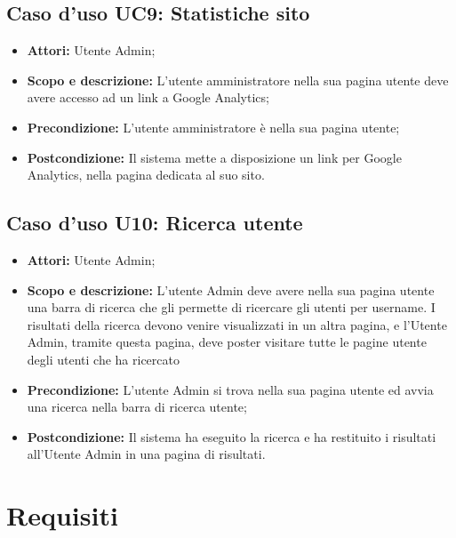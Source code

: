 \documentclass[12pt,a4paper,titlepage]{article}
\begin{document}
		\subsection{Caso d'uso UC9: Statistiche sito}
	\label{UC9}
	\begin{itemize}
		\item \textbf{Attori: }Utente Admin;
		\item \textbf{Scopo e descrizione: }L'utente amministratore nella sua pagina utente deve avere accesso ad un link a Google Analytics;
		\item \textbf{Precondizione: }L'utente amministratore è nella sua pagina utente;
		\item \textbf{Postcondizione: }Il sistema mette a disposizione un link per Google Analytics, nella pagina dedicata al suo sito.
	\end{itemize}
	\subsection{Caso d'uso U10: Ricerca utente}
	\label{UC10}
	\begin{itemize}
		\item \textbf{Attori: }Utente Admin;
		\item \textbf{Scopo e descrizione: }L'utente Admin deve avere nella sua pagina utente una barra di ricerca che gli permette di ricercare gli utenti per username. I risultati della ricerca devono venire visualizzati in un altra pagina, e l'Utente Admin, tramite questa pagina, deve poster visitare tutte le pagine utente degli utenti che ha ricercato
		\item \textbf{Precondizione: }L'utente Admin si trova nella sua pagina utente ed avvia una ricerca nella barra di ricerca utente;
		\item \textbf{Postcondizione: }Il sistema ha eseguito la ricerca e ha restituito i risultati all'Utente Admin in una pagina di risultati.
	\end{itemize}
	
	\newpage
	\section{Requisiti}
\end{document}
